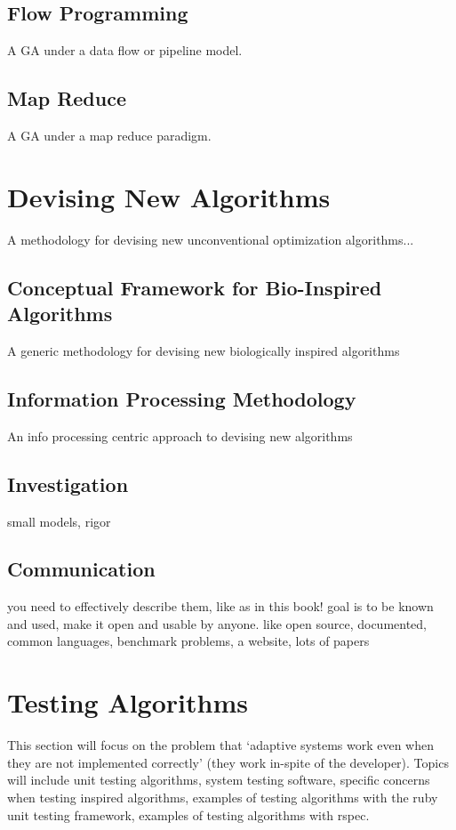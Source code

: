 \begin{bibunit}
\subsection{Flow Programming}
A GA under a data flow or pipeline model.

\subsection{Map Reduce}
A GA under a map reduce paradigm.


% 
% 
\section{Devising New Algorithms}
\label{advanced:sec:devising}
A methodology for devising new unconventional optimization algorithms...

\subsection{Conceptual Framework for Bio-Inspired Algorithms}
A generic methodology for devising new biologically inspired algorithms

\subsection{Information Processing Methodology}
An info processing centric approach to devising new algorithms

\subsection{Investigation}
small models, rigor

\subsection{Communication}
you need to effectively describe them, like as in this book!
goal is to be known and used, make it open and usable by anyone. like open source, documented, common languages, benchmark problems, a website, lots of papers


% 
% 
\section{Testing Algorithms}
\label{advanced:sec:testing}
This section will focus on the problem that `adaptive systems work even when they are not implemented correctly' (they work in-spite of the developer). Topics will include unit testing algorithms, system testing software, specific concerns when testing inspired algorithms, examples of testing algorithms with the ruby unit testing framework, examples of testing algorithms with rspec.


\end{bibunit}
